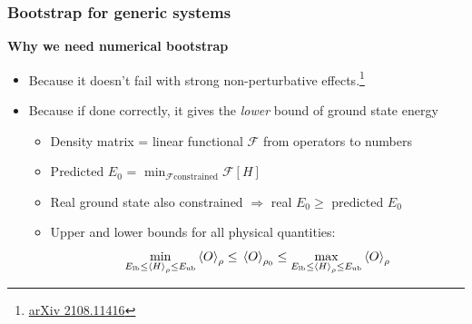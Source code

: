\documentclass{beamer}
\begin{document}
\begin{frame}
\frametitle{Bootstrap for generic systems}

\textbf{Why we need numerical bootstrap}

\begin{itemize}
    \item Because it doesn't fail with strong non-perturbative effects.\footnote{\href{https://arxiv.org/abs/2108.11416}{arXiv 2108.11416}}
    \item Because if done correctly, it gives the \emph{lower} bound of ground state energy
    \begin{itemize}
        \item Density matrix = linear functional $\mathcal{F}$ from operators to numbers
        \item Predicted $E_0$ = $\min_{\mathcal{F} \text{constrained}} \mathcal{F}[H]$
        \item Real ground state also constrained $\Rightarrow$ real $E_0 \geq $ predicted $E_0$
        \item Upper and lower bounds for all physical quantities:
        \begin{equation}
            \min_{E_\text{lb} \leq \expval*{H}_\rho \leq E_\text{ub}} \expval{O}_\rho \leq \expval*{O}_{\rho_0} \leq \max_{E_\text{lb} \leq \expval*{H}_\rho \leq E_\text{ub}} \expval{O}_\rho
        \end{equation}
    \end{itemize}
\end{itemize}    

\end{frame}
\end{document}
